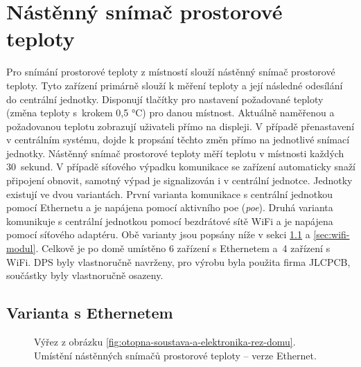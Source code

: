 \section{Nástěnný snímač prostorové teploty}

Pro snímání prostorové teploty z místností slouží nástěnný snímač prostorové teploty. Tyto zařízení primárně slouží k měření teploty a její následné odesílání do centrální jednotky. Disponují tlačítky pro nastavení požadované teploty (změna teploty s~krokem 0,5 °C) pro danou místnost. Aktuálně naměřenou a požadovanou teplotu zobrazují uživateli přímo na displeji. V případě přenastavení v centrálním systému, dojde k propsání těchto změn přímo na jednotlivé snímací jednotky.  Nástěnný snímač prostorové teploty měří teplotu v místnosti každých 30~sekund. V případě síťového výpadku komunikace se zařízení automaticky snaží připojení obnovit, samotný výpad je signalizován i v centrální jednotce. Jednotky existují ve dvou variantách. První varianta komunikace s centrální jednotkou pomocí Ethernetu a je napájena pomocí aktivního \acrshort{poe} (\textit{\acrlong{poe}}). Druhá varianta komunikuje s centrální jednotkou pomocí bezdrátové sítě WiFi a je napájena pomocí síťového adaptéru. Obě varianty jsou popsány níže v sekci \ref{sec:ethernet-modul} a \ref{sec:wifi-modul}. Celkově je po domě umístěno 6 zařízení s Ethernetem a~4 zařízení s WiFi. DPS byly vlastnoručně navrženy, pro výrobu byla použita firma JLCPCB, součástky byly vlastnoručně osazeny.

\subsection{Varianta s Ethernetem}
\label{sec:ethernet-modul}

\begin{figure}[H]
   \centering
   \def\svgwidth{0.5\columnwidth}
   
    \caption[Umístění nástěnných snímačů prostorové teploty – verze Ethernet.]{Výřez z obrázku \ref{fig:otopna-soustava-a-elektronika-rez-domu}. Umístění nástěnných snímačů prostorové teploty – verze Ethernet.}
    \label{fig:vyrez-nastenny-snimac-prostorove-teploty-ethernet}
\end{figure}

